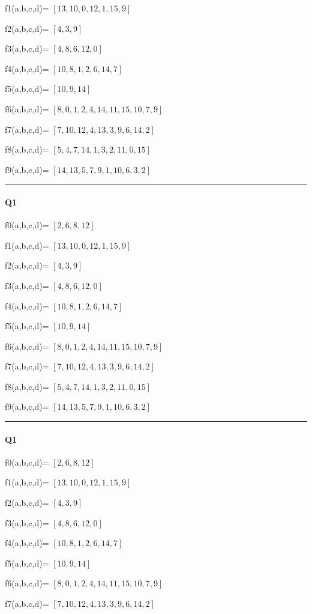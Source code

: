 f1(a,b,c,d)= $[13, 10, 0, 12, 1, 15, 9]$

f2(a,b,c,d)= $[4, 3, 9]$

f3(a,b,c,d)= $[4, 8, 6, 12, 0]$

f4(a,b,c,d)= $[10, 8, 1, 2, 6, 14, 7]$

f5(a,b,c,d)= $[10, 9, 14]$

f6(a,b,c,d)= $[8, 0, 1, 2, 4, 14, 11, 15, 10, 7, 9]$

f7(a,b,c,d)= $[7, 10, 12, 4, 13, 3, 9, 6, 14, 2]$

f8(a,b,c,d)= $[5, 4, 7, 14, 1, 3, 2, 11, 0, 15]$

f9(a,b,c,d)= $[14, 13, 5, 7, 9, 1, 10, 6, 3, 2]$


\hrule width 1\linewidth
\paragraph{Q1}


f0(a,b,c,d)= $[2, 6, 8, 12]$

f1(a,b,c,d)= $[13, 10, 0, 12, 1, 15, 9]$

f2(a,b,c,d)= $[4, 3, 9]$

f3(a,b,c,d)= $[4, 8, 6, 12, 0]$

f4(a,b,c,d)= $[10, 8, 1, 2, 6, 14, 7]$

f5(a,b,c,d)= $[10, 9, 14]$

f6(a,b,c,d)= $[8, 0, 1, 2, 4, 14, 11, 15, 10, 7, 9]$

f7(a,b,c,d)= $[7, 10, 12, 4, 13, 3, 9, 6, 14, 2]$

f8(a,b,c,d)= $[5, 4, 7, 14, 1, 3, 2, 11, 0, 15]$

f9(a,b,c,d)= $[14, 13, 5, 7, 9, 1, 10, 6, 3, 2]$


\hrule width 1\linewidth
\paragraph{Q1}


f0(a,b,c,d)= $[2, 6, 8, 12]$

f1(a,b,c,d)= $[13, 10, 0, 12, 1, 15, 9]$

f2(a,b,c,d)= $[4, 3, 9]$

f3(a,b,c,d)= $[4, 8, 6, 12, 0]$

f4(a,b,c,d)= $[10, 8, 1, 2, 6, 14, 7]$

f5(a,b,c,d)= $[10, 9, 14]$

f6(a,b,c,d)= $[8, 0, 1, 2, 4, 14, 11, 15, 10, 7, 9]$

f7(a,b,c,d)= $[7, 10, 12, 4, 13, 3, 9, 6, 14, 2]$

